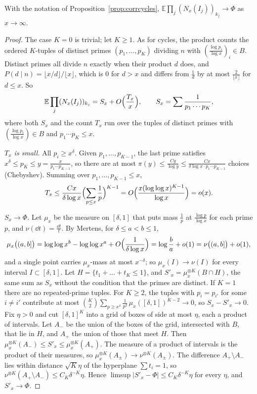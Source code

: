\begin{proposition}\label{prop:corrprimes}
With the notation of Proposition~\ref{prop:corrcycles}, $\mathbb E\prod_j(N_x(I_j))_{k_j}\to\Phi$ as $x\to\infty$.
\end{proposition}
\begin{proof}
The case $K=0$ is trivial; let $K\ge1$. As for cycles, the product counts the ordered $K$-tuples of distinct primes $(p_1,\dots,p_K)$ dividing $n$ with $(\frac{\log p_i}{\log x})_i\in B$. Distinct primes all divide $n$ exactly when their product $d$ does, and
$P(d\mid n)=\lfloor x/d\rfloor/\lfloor x\rfloor$, which is $0$ for $d>x$ and differs from $\frac1d$ by at most $\frac2{\lfloor x\rfloor}$ for $d\le x$. So
\[
\mathbb E\prod_j(N_x(I_j))_{k_j}=S_x+O\Bigl(\frac{T_x}x\Bigr),\qquad S_x=\sum\frac1{p_1\cdots p_K},
\]
where both $S_x$ and the count $T_x$ run over the tuples of distinct primes with $(\frac{\log p_i}{\log x})\in B$ and $p_1\cdots p_K\le x$.

\emph{$T_x$ is small.} All $p_i\ge x^\delta$. Given $p_1,\dots,p_{K-1}$, the last prime satisfies $x^\delta\le p_K\le y=\frac x{p_1\cdots p_{K-1}}$, so there are at most $\pi(y)\le\frac{Cy}{\log y}\le\frac{Cx}{\delta\log x\cdot p_1\cdots p_{K-1}}$ choices (Chebyshev). Summing over $p_1,\dots,p_{K-1}\le x$,
\[
T_x\le\frac{Cx}{\delta\log x}\Bigl(\sum_{p\le x}\frac1p\Bigr)^{K-1}=O\Bigl(\frac{x(\log\log x)^{K-1}}{\log x}\Bigr)=o(x).
\]

\emph{$S_x\to\Phi$.} Let $\mu_x$ be the measure on $[\delta,1]$ that puts mass $\frac1p$ at $\frac{\log p}{\log x}$ for each prime $p$, and $\nu(\dd t)=\frac{\dd t}t$. By Mertens, for $\delta\le a<b\le1$,
\[
\mu_x\bigl((a,b]\bigr)=\log\log x^b-\log\log x^a+O\Bigl(\frac1{\delta\log x}\Bigr)=\log\frac ba+o(1)=\nu\bigl((a,b]\bigr)+o(1),
\]
and a single point carries $\mu_x$-mass at most $x^{-\delta}$; so $\mu_x(I)\to\nu(I)$ for every interval $I\subset[\delta,1]$. Let $H=\{t_1+\dots+t_K\le1\}$, and $S'_x=\mu_x^{\otimes K}(B\cap H)$, the same sum as $S_x$ without the condition that the primes are distinct. If $K=1$ there are no repeated-prime tuples. For $K\ge2$, the tuples with $p_i=p_{i'}$ for some
$i\ne i'$ contribute at most $\binom K2\sum_{p\ge x^\delta}\frac1{p^2}\,\mu_x([\delta,1])^{K-2}\to0$, so $S_x-S'_x\to0$. Fix $\eta>0$ and cut $[\delta,1]^K$ into a grid of boxes of side at most $\eta$, each a product of intervals. Let $A_-$ be the union of the boxes of the grid, intersected with $B$, that lie in $H$, and $A_+$
the union of those that meet $H$. Then $\mu_x^{\otimes K}(A_-)\le S'_x\le\mu_x^{\otimes K}(A_+)$. The measure of a product of intervals is the product of their measures, so $\mu_x^{\otimes K}(A_\pm)\to\nu^{\otimes K}(A_\pm)$. The difference $A_+\setminus A_-$ lies within distance $\sqrt K\eta$ of the hyperplane
$\sum t_i=1$, so $\nu^{\otimes K}(A_+\setminus A_-)\le C_K\delta^{-K}\eta$. Hence $\limsup|S'_x-\Phi|\le C_K\delta^{-K}\eta$ for every $\eta$, and $S'_x\to\Phi$.
\end{proof}

